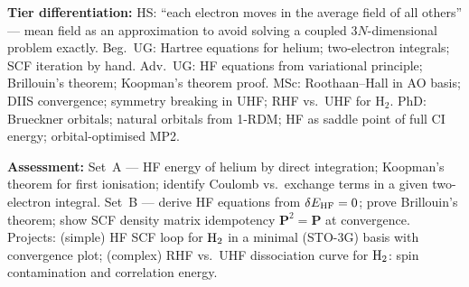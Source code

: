 \documentclass[11pt,a4paper]{article}
\begin{document}
\begin{tcolorbox}[modulebox, title={Module~II.1 / L03: Hartree and Hartree--Fock Theory}]
\medskip\textbf{Tier differentiation:}
HS: ``each electron moves in the average field of all others'' --- mean field as an
approximation to avoid solving a coupled 3$N$-dimensional problem exactly.
Beg.\ UG: Hartree equations for helium; two-electron integrals; SCF iteration by hand.
Adv.\ UG: HF equations from variational principle; Brillouin's theorem; Koopman's theorem proof.
MSc: Roothaan--Hall in AO basis; DIIS convergence; symmetry breaking in UHF; RHF vs.\ UHF for H$_2$.
PhD: Brueckner orbitals; natural orbitals from 1-RDM; HF as saddle point of full CI energy;
orbital-optimised MP2.

\medskip\textbf{Assessment:}
Set~A --- HF energy of helium by direct integration; Koopman's theorem for first ionisation;
identify Coulomb vs.\ exchange terms in a given two-electron integral.
Set~B --- derive HF equations from $\delta E_{\rm HF}=0$; prove Brillouin's theorem;
show SCF density matrix idempotency $\mathbf{P}^2=\mathbf{P}$ at convergence.
Projects: (simple) HF SCF loop for $\rm H_2$ in a minimal (STO-3G) basis with convergence plot;
(complex) RHF vs.\ UHF dissociation curve for $\rm H_2$: spin contamination and correlation energy.
\end{tcolorbox}

\medskip
\end{document}
